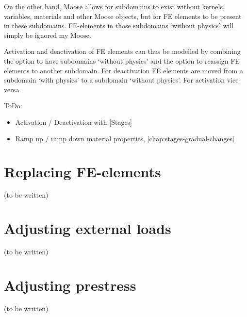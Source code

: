 On the other hand, Moose allows for subdomains to exist without kernels,
variables, materials and other Moose objects, but for FE elements to be present
in these subdomains. FE-elements in those subdomains ‘without physics’ will
simply be ignored my Moose.

Activation and deactivation of FE elements can thus be modelled by combining
the option to have subdomains ‘without physics’ and the option to reassign FE
elements to another subdomain. For deactivation FE elements are moved from a
subdomain ‘with physics’ to a subdomain ‘without physics’. For activation vice
versa.

ToDo:
\begin{itemize}
      \item Activation / Deactivation with [Stages]
      \item Ramp up / ramp down material properties, \autoref{chap:stages-gradual-changes}
\end{itemize}

\section{Replacing FE-elements}
\label{chap:stages-element-replacement}

(to be written)

\section{Adjusting external loads}
\label{chap:stages-loads}

(to be written)

\section{Adjusting prestress}
\label{chap:stages-prestress}

(to be written)